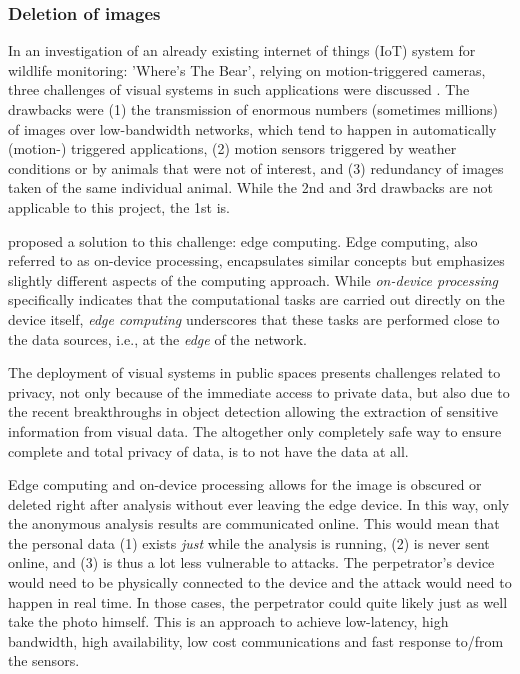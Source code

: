 \subsubsection{Deletion of images}
\label{sec:deletion_of_images}
In an investigation of an already existing internet of things (IoT) system for wildlife monitoring: 'Where's The Bear', relying on motion-triggered cameras, three challenges of visual systems in such applications were discussed \cite{el2017WTB}. The drawbacks were (1) the transmission of enormous numbers (sometimes millions) of images over low-bandwidth networks, which tend to happen in automatically (motion-) triggered applications, (2) motion sensors triggered by weather conditions or by animals that were not of interest, and (3) redundancy of images taken of the same individual animal. While the 2nd and 3rd drawbacks are not applicable to this project, the 1st is.

\citeauthor{el2017WTB} proposed a solution to this challenge: edge computing. Edge computing, also referred to as on-device processing, encapsulates similar concepts but emphasizes slightly different aspects of the computing approach. While \textit{on-device processing} specifically indicates that the computational tasks are carried out directly on the device itself, \textit{edge computing} underscores that these tasks are performed close to the data sources, i.e., at the \textit{edge} of the network.

The deployment of visual systems in public spaces presents challenges related to privacy, not only because of the immediate access to private data, but also due to the recent breakthroughs in object detection allowing the extraction of sensitive information from visual data. The altogether only completely safe way to ensure complete and total privacy of data, is to not have the data at all.

Edge computing and on-device processing allows for the image is obscured or deleted right after analysis without ever leaving the edge device. In this way, only the anonymous analysis results are communicated online. This would mean that the personal data (1) exists \textit{just} while the analysis is running, (2) is never sent online, and (3) is thus a lot less vulnerable to attacks. The perpetrator's device would need to be physically connected to the device and the attack would need to happen in real time. In those cases, the perpetrator could quite likely just as well take the photo himself. This is an approach to achieve low-latency, high bandwidth, high availability, low cost communications and fast response to/from the sensors.

